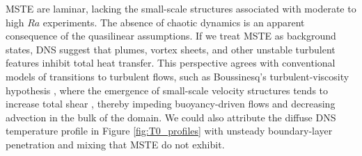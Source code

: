 \documentclass[reprint,amsmath,amssymb,aps]{revtex4-1}
\begin{document}
MSTE are laminar, lacking the small-scale structures associated with moderate to high $Ra$ experiments. 
The absence of chaotic dynamics is an apparent consequence of the quasilinear assumptions. 
If we treat MSTE as background states, DNS suggest that plumes, vortex sheets, and other unstable turbulent features inhibit total heat transfer. 
This perspective agrees with conventional models of transitions to turbulent flows, such as Boussinesq's turbulent-viscosity hypothesis \cite{boussinesq_1877}, where the emergence of small-scale velocity structures tends to increase total shear \cite{Lecoanet_KH, drazin_reid_2004, pope_2000}, thereby impeding buoyancy-driven flows and decreasing advection in the bulk of the domain. 
We could also attribute the diffuse DNS temperature profile in Figure \ref{fig:T0_profiles} with unsteady boundary-layer penetration and mixing that MSTE do not exhibit.
\end{document}
